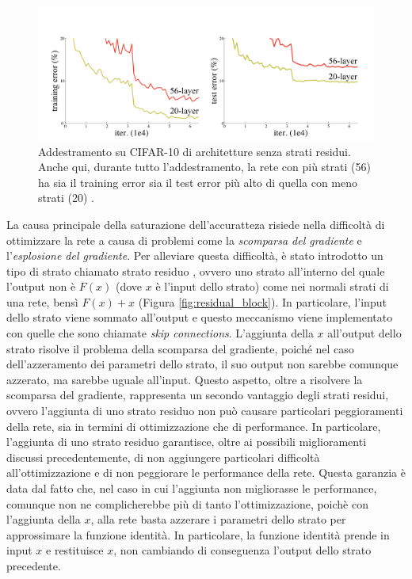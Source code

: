 \begin{figure}[h!]
    \centering
    \hspace*{-0.27in}
    \includegraphics[scale=0.55]{img/cifar10_plainet.png}
    \caption{Addestramento su CIFAR-10 di architetture senza strati residui. Anche qui, durante tutto l'addestramento, la rete con più strati (56) ha sia il training error sia il test error più alto di quella con meno strati (20) \cite{resnets}.}
    \label{fig:cifar10_plain}
\end{figure}

La causa principale della saturazione dell'accuratteza risiede nella difficoltà di ottimizzare la rete a causa di problemi come la \textit{scomparsa del gradiente} e l'\textit{esplosione del gradiente}. Per alleviare questa difficoltà, è stato introdotto un tipo di strato chiamato strato residuo \cite{resnets}, ovvero uno strato all'interno del quale l'output non è $F(x)$ (dove $x$ è l'input dello strato) come nei normali strati di una rete,  bensì $F(x)+x$ (Figura \ref{fig:residual_block}). In particolare, l'input dello strato viene sommato all'output e questo meccanismo viene implementato con quelle che sono chiamate \textit{skip connections}. L'aggiunta della $x$ all'output dello strato risolve il problema della scomparsa del gradiente, poiché nel caso dell'azzeramento dei parametri dello strato, il suo output non sarebbe comunque azzerato, ma  sarebbe uguale all'input. Questo aspetto, oltre a risolvere la scomparsa del gradiente, rappresenta un secondo vantaggio degli strati residui, ovvero l'aggiunta di uno strato residuo non può causare particolari peggioramenti della rete, sia in termini di ottimizzazione che di performance. In particolare, l'aggiunta di uno strato residuo garantisce, oltre ai possibili miglioramenti discussi precedentemente, di non aggiungere particolari difficoltà all'ottimizzazione e di non peggiorare le performance della rete. Questa garanzia è data dal fatto che, nel caso in cui l'aggiunta non migliorasse le performance, comunque non ne complicherebbe più di tanto l'ottimizzazione, poichè con l'aggiunta della $x$, alla rete basta azzerare i parametri dello strato per approssimare la funzione identità. In particolare, la funzione identità prende in input $x$ e restituisce $x$, non cambiando di conseguenza l'output dello strato precedente. 


